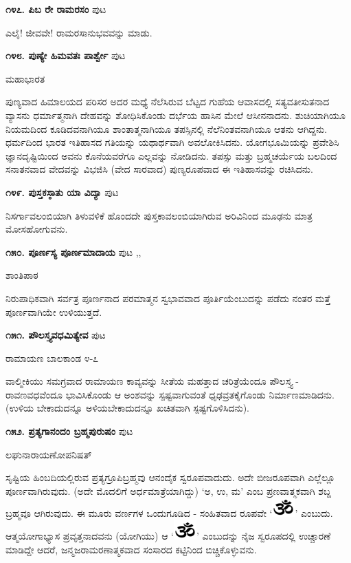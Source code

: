 \medskip
\noindent\textbf{೧೪೭. ಪಿಬ ರೇ ರಾಮರಸಂ} \hfill ಪುಟ \pageref{187}

ಎಲೈ! ಜೀವವೇ! ರಾಮರಸಾನುಭವವನ್ನು ಮಾಡು. 

\medskip
\noindent\textbf{೧೪೮. ಪುಣ್ಯೇ ಹಿಮವತಃ ಪಾರ್ಶ್ವೇ} \hfill ಪುಟ \pageref{118b}

\hfill ಮಹಾಭಾರತ

ಪುಣ್ಯವಾದ ಹಿಮಾಲಯದ ಪರಿಸರ ಅದರ ಮಧ್ಯೆ ನೆಲೆಸಿರುವ ಬೆಟ್ಟದ ಗುಹೆಯ ಆವಾಸದಲ್ಲಿ ಸತ್ಯವತೀಸುತನಾದ ವ್ಯಾಸನು ಧರ್ಮಾತ್ಮನಾಗಿ ದೇಹವನ್ನು ಶೋಧಿಸಿಕೊಂಡು ದರ್ಭೆಯ ಹಾಸಿನ ಮೇಲೆ ಆಸೀನನಾದನು. ಶುಚಿಯಾಗಿಯೂ ನಿಯಮದಿಂದ ಕೂಡಿದವನಾಗಿಯೂ ಶಾಂತಾತ್ಮನಾಗಿಯೂ ತಪಸ್ಸಿನಲ್ಲಿ ನೆಲೆನಿಂತವನಾಗಿಯೂ ಆತನು ಆಗಿದ್ದನು. ಧರ್ಮದಿಂದ ಭಾರತ ಇತಿಹಾಸದ ಗತಿಯನ್ನು ಯಥಾರ್ಥವಾಗಿ ಅವಲೋಕಿಸಿದನು. ಯೋಗಭೂಮಿಯನ್ನು ಪ್ರವೇಶಿಸಿ ಜ್ಞಾನದೃಷ್ಟಿಯಿಂದ ಅವನು ಕೊನೆಯವರೆಗೂ ಎಲ್ಲವನ್ನು ನೋಡಿದನು. ತಪಸ್ಸು ಮತ್ತು ಬ್ರಹ್ಮಚರ್ಯೆಯ ಬಲದಿಂದ ಸನಾತನವಾದ ವೇದವನ್ನು ವಿಭಜಿಸಿ (ವೇದ ಸಾರವಾದ) ಪುಣ್ಯರೂಪವಾದ ಈ ಇತಿಹಾಸವನ್ನು ರಚಿಸಿದನು.

\medskip
\noindent\textbf{೧೪೯. ಪುಸ್ತಕಸ್ಠಾತು ಯಾ ವಿದ್ಯಾ} \hfill ಪುಟ \pageref{114}

ನಿಸರ್ಗಾವಲಂಬಿಯಾಗಿ ತಿಳುವಳಿಕೆ ಹೊಂದದೇ ಪುಸ್ತಕಾವಲಂಬಿಯಾಗಿರುವ ಅರಿವಿನಿಂದ ಮೂಢನು ಮಾತ್ರ ಮೋಸಹೋಗುವನು.

\medskip
\noindent\textbf{೧೫೦. ಪೂರ್ಣಸ್ಯ ಪೂರ್ಣಮಾದಾಯ} \hfill ಪುಟ \pageref{23},\pageref{48a},\pageref{268}

\hfill ಶಾಂತಿಪಾಠ

ನಿರುಪಾಧಿಕವಾಗಿ ಸರ್ವತ್ರ ಪೂರ್ಣನಾದ ಪರಮಾತ್ಮನ ಸ್ವಭಾವವಾದ ಪೂರ್ತಿಯೆಂಬುದನ್ನು ಪಡೆದು ನಂತರ ಮತ್ತೆ ಪೂರ್ಣವಾಗಿಯೇ ಉಳಿಯುತ್ತದೆ.

\medskip
\noindent\textbf{೧೫೧. ಪೌಲಸ್ತ್ಯವಧಮಿತ್ಯೇವ} \hfill ಪುಟ \pageref{207c}

\hfill ರಾಮಾಯಣ ಬಾಲಕಾಂಡ ೪-೭

ವಾಲ್ಮೀಕಿಯು ಸಮಗ್ರವಾದ ರಾಮಾಯಣ ಕಾವ್ಯವನ್ನು ಸೀತೆಯ ಮಹತ್ತಾದ ಚರಿತ್ರೆಯೆಂದೂ ಪೌಲಸ್ತ್ಯ - ರಾವಣವಧವೆಂದೂ ಭಾವಿಸಿಕೊಂಡು ಆ ಅಂಶವನ್ನು ಸ್ಪಷ್ಟವಾಗುವಂತೆ ಧೃಢವ್ರತಕೈಗೊಂಡು ನಿರ್ಮಾಣಮಾಡಿದನು. (ಉಳಿಯ ಬೇಕಾದುದನ್ನೂ ಅಳಿಯಬೇಕಾದುದನ್ನೂ ಖಚಿತವಾಗಿ ಸ್ಪಷ್ಟಗೊಳಿಸಿದನು).

\medskip
\noindent\textbf{೧೫೨. ಪ್ರತ್ಯಗಾನಂದಂ ಬ್ರಹ್ಮಪುರುಷಂ} \hfill ಪುಟ \pageref{106a}

\hfill ಲಘುನಾರಾಯಣೋಪನಿಷತ್

ಸೃಷ್ಟಿಯ ಹಿಂಬದಿಯಲ್ಲಿರುವ ಪ್ರತ್ಯಗ್ರೂಪಿಬ್ರಹ್ಮವು ಆನಂದೈಕ ಸ್ವರೂಪವಾದುದು. ಅದೇ ಬೀಜರೂಪವಾಗಿ ಎಲ್ಲೆಲ್ಲೂ ಪೂರ್ಣವಾಗಿರುವುದು. (ಅದೇ ಮೊದಲಿಗೆ ಅರ್ಧಮಾತ್ರೆಯಾಗಿದ್ದು) `ಅ, ಉ, ಮ' ಎಂಬ ಪ್ರಣವಾತ್ಮಕವಾಗಿ ಶಬ್ದ ಬ್ರಹ್ಮವೂ ಆಗಿರುವುದು. ಈ ಮೂರು ವರ್ಣಗಳ ಒಂದುಗೂಡಿದ - ಸಂಹಿತವಾದ ರೂಪವೇ `\includegraphics{Om-PNG.eps}' ಎಂಬುದು. ಆತ್ಮಯೋಗಾಭ್ಯಾಸ ಪ್ರವೃತ್ತನಾದವನು (ಯೋಗಿಯು) ಆ `\includegraphics{Om-PNG.eps}' ಎಂಬುದನ್ನು ನೈಜ ಸ್ವರೂಪದಲ್ಲಿ  ಉಚ್ಚಾರಣೆ ಮಾಡಿದ್ದೇ ಆದರೆ, ಜನ್ಮಜರಾಮರಣಾತ್ಮಕವಾದ ಸಂಸಾರದ ಕಟ್ಟಿನಿಂದ ಬಿಚ್ಚಿಕೊಳ್ಳುವನು. 


